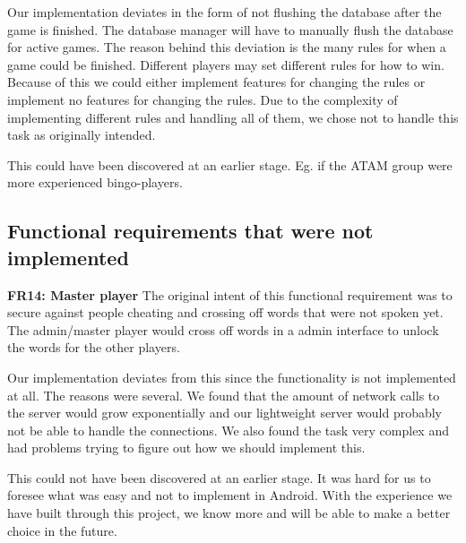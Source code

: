 Our implementation deviates in the form of not flushing the database after the game is finished. The database manager will have to manually flush the database for active games. The reason behind this deviation is the many rules for when a game could be finished. Different players may set different rules for how to win. Because of this we could either implement features for changing the rules or implement no features for changing the rules. Due to the complexity of implementing different rules and handling all of them, we chose not to handle this task as originally intended. 

This could have been discovered at an earlier stage. Eg. if the ATAM group were more experienced bingo-players.


\subsection{Functional requirements that were not implemented}

\textbf{FR14: Master player}
The original intent of this functional requirement was to secure against people cheating and crossing off words that were not spoken yet. The admin/master player would cross off words in a admin interface to unlock the words for the other players. 

Our implementation deviates from this since the functionality is not implemented at all. The reasons were several. We found that the amount of network calls to the server would grow exponentially and our lightweight server would probably not be able to handle the connections. We also found the task very complex and had problems trying to figure out how we should implement this. 

This could not have been discovered at an earlier stage. It was hard for us to foresee what was easy and not to implement in Android. With the experience we have built through this project, we know more and will be able to make a better choice in the future. 